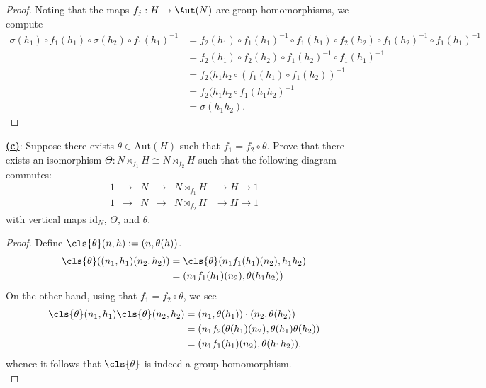 \documentclass[12pt]{article}
\begin{document}
\begin{homeworkProblem}
  \begin{proof}
    Noting that the maps $ f_{j}:H\to \Aut(N)  $ are group homomorphisms, we compute
    \begin{align*}
      \sigma(h_1) \circ f_1(h_1) \circ \sigma(h_2) \circ f_1(h_1)^{-1} &= f_{2}(h_{1})\circ f_{1}(h_{1})^{-1} \circ f_1(h_1) \circ f_{2}(h_{2})\circ f_{1}(h_{2})^{-1} \circ f_1(h_1)^{-1} \\
      &= f_{2}(h_{1})  \circ f_{2}(h_{2})\circ f_{1}(h_{2})^{-1} \circ f_1(h_1)^{-1} \\
      &= f_{2}(h_{1}h_{2}\circ (f_{1}(h_{1}) \circ f_1(h_2))^{-1} \\
      &= f_{2}(h_{1}h_{2}\circ f_{1}(h_{1}h_2)^{-1} \\
      &= \sigma(h_{1}h_{2}).
    \end{align*}
  \end{proof}

  \underline{\textbf{(c)}}: Suppose there exists $\theta \in \mathrm{Aut}(H)$ such that $f_1 = f_2 \circ \theta$.  
  Prove that there exists an isomorphism $\Theta : N \rtimes_{f_1} H \cong N \rtimes_{f_2} H$ such that the following diagram commutes:
  \[
  \begin{array}{cccccc}
  1 & \to & N & \to & N \rtimes_{f_1} H & \to H \to 1 \\
  1 & \to & N & \to & N \rtimes_{f_2} H & \to H \to 1
  \end{array}
  \]
  with vertical maps $\mathrm{id}_N$, $\Theta$, and $\theta$.

  \begin{proof}
    Define $ \cls{\theta}(n,h):= (n,\theta(h)) $.
    \begin{align*}
      \cls{\theta}((n_{1},h_{1})(n_{2},h_{2})) &= \cls{\theta}(n_{1}f_{1}(h_{1})(n_{2}), h_{1}h_{2})  \\
      &= (n_{1}f_{1}(h_{1})(n_{2}), \theta(h_{1}h_{2}))  \\
    \end{align*}
    On the other hand, using that $ f_{1} = f_{2}\circ \theta $, we see
    \begin{align*}
      \cls{\theta}(n_{1},h_{1})\cls{\theta}(n_{2},h_{2}) &= (n_{1}, \theta(h_{1})) \cdot (n_{2}, \theta(h_{2})) \\
      &= (n_{1}f_{2}(\theta(h_{1})(n_{2}), \theta(h_{1}) \theta(h_{2}))\\
      &= (n_{1}f_{1}(h_{1})(n_{2}), \theta(h_{1}h_{2})),
    \end{align*}
    whence it follows that $ \cls{\theta} $ is indeed a group homomorphism.\\


\end{proof}
\end{homeworkProblem}
\end{document}

